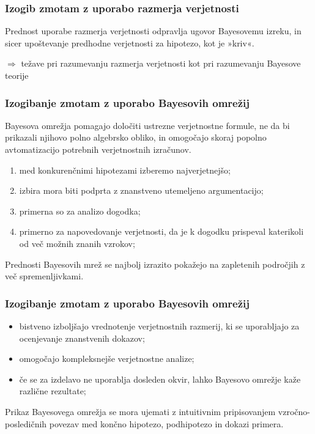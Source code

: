 \documentclass{beamer}
\begin{document}
\begin{frame}
    \frametitle{Izogib zmotam z uporabo razmerja verjetnosti}
    \begin{block}{Prednost uporabe razmerja verjetnosti}
        odpravlja ugovor Bayesovemu izreku, in sicer upoštevanje predhodne verjetnosti za hipotezo, kot je »kriv«.
    \end{block}\vspace{3mm}
    \centering
    $\Rightarrow$ težave pri razumevanju razmerja verjetnosti kot pri razumevanju Bayesove teorije
\end{frame}

\begin{frame}
    \frametitle{Izogibanje zmotam z uporabo Bayesovih omrežij}
    \begin{block}{}
        Bayesova omrežja pomagajo določiti ustrezne verjetnostne formule, ne da bi prikazali njihovo polno algebrsko obliko, in omogočajo skoraj popolno avtomatizacijo potrebnih verjetnostnih izračunov.
    \end{block} \vspace{3mm}
    \begin{enumerate}
        \item med konkurenčnimi hipotezami izberemo najverjetnejšo;
        \item izbira mora biti podprta z znanstveno utemeljeno argumentacijo;
        \item primerna so za analizo dogodka;
        \item primerno za napovedovanje verjetnosti, da je k dogodku prispeval katerikoli od več možnih znanih vzrokov;
    \end{enumerate}
    \begin{block}{}
        Prednosti Bayesovih mrež se najbolj izrazito pokažejo na zapletenih področjih z več spremenljivkami.
    \end{block}
\end{frame}

\begin{frame}
    \frametitle{Izogibanje zmotam z uporabo Bayesovih omrežij}
    \begin{itemize}
        \item bistveno izboljšajo vrednotenje verjetnostnih razmerij, ki se uporabljajo za ocenjevanje znanstvenih dokazov;
        \item omogočajo kompleksnejše verjetnostne analize;
        \item če se za izdelavo ne uporablja dosleden okvir, lahko Bayesovo omrežje kaže različne rezultate;
    \end{itemize} \vspace{3mm}
    \begin{block}{}
        Prikaz Bayesovega omrežja se mora ujemati z intuitivnim pripisovanjem vzročno-posledičnih povezav med končno hipotezo, podhipotezo in dokazi primera.
    \end{block}
\end{frame}

\end{document}
